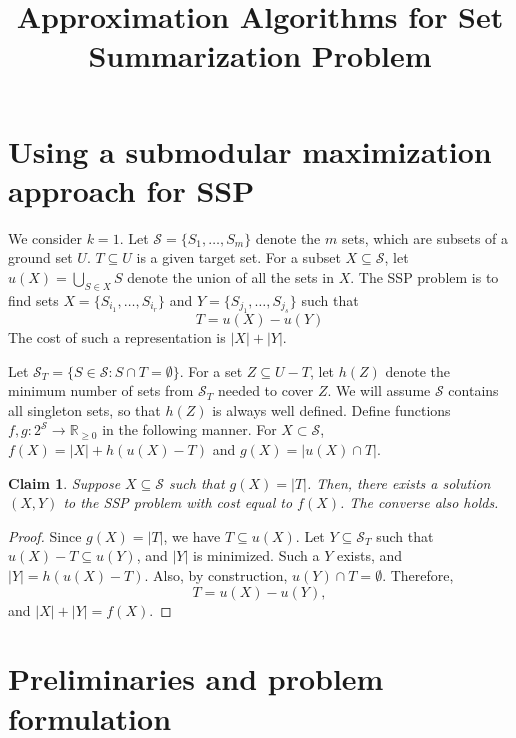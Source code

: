 \documentclass[twoside, leqno, twocolumn]{article}
\title{Approximation Algorithms for Set Summarization Problem}
\newtheorem{claim}[lemma]{Claim} %
\begin{document}
%










\section{Using a submodular maximization approach for SSP}
We consider $k=1$.
Let $\mathcal{S} = \{S_1,\ldots,S_m\}$ denote the $m$ sets, which are subsets of
a ground set $U$. $T\subseteq U$ is a given target set.  For a subset
$X\subseteq \mathcal{S}$, let $u(X)=\bigcup_{S\in X} S$ denote the union of all the
sets in $X$.  The SSP problem is to
find sets $X=\{S_{i_1},\ldots,S_{i_r}\}$ and $Y=\{S_{j_1},\ldots,S_{j_s}\}$ such that
\[
T= u(X) - u(Y)
\]
The cost of such a representation is $|X|+|Y|$.

Let $\mathcal{S}_T=\{S\in\mathcal{S}: S\cap T=\emptyset\}$.
For a set $Z\subseteq U-T$, let $h(Z)$ denote the minimum number of sets from $\mathcal{S}_T$
needed to cover $Z$. We will assume $\mathcal{S}$ contains all singleton sets, so that
$h(Z)$ is always well defined.
Define functions $f,g:2^{\mathcal{S}}\rightarrow \mathbb{R}_{\geq 0}$ in the following manner.
For $X\subset \mathcal{S}$, $f(X)=|X| + h(u(X)-T)$ and $g(X)=|u(X)\cap T|$.

\begin{claim}
Suppose $X\subseteq\mathcal{S}$ such that $g(X)=|T|$. Then, there exists a solution $(X, Y)$
to the SSP problem with cost equal to $f(X)$. The converse also holds.
\end{claim}
\begin{proof}
Since $g(X)=|T|$, we have $T\subseteq u(X)$. Let $Y\subseteq \mathcal{S}_T$
such that $u(X)-T \subseteq u(Y)$, and $|Y|$ is minimized.
Such a $Y$ exists, and $|Y|=h(u(X)-T)$. Also, by construction, $u(Y)\cap T=\emptyset$.
Therefore,
\[
T = u(X) - u(Y),
\]
and $|X|+|Y| = f(X)$.
\end{proof}

\section{Preliminaries and problem formulation}
\end{document}
